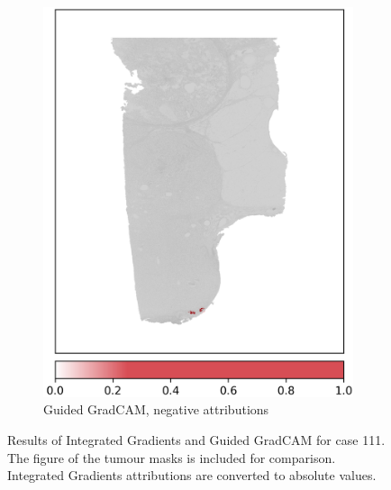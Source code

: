 \begin{figure}[h!t]
\begin{subfigure}[b]{0.49\textwidth}
         \includegraphics[width=\textwidth]{latex/captum/case111/guided_gradcam_neg_case111-stain1-censored_3499days.png}
         \caption{Guided GradCAM, negative attributions}
     \end{subfigure}
    \hfill
    \caption[Integrated gradients and Guided GradCAM for case 111]{Results of Integrated Gradients and Guided GradCAM for case 111. The figure of the tumour masks is included for comparison. Integrated Gradients attributions are converted to absolute values.}
    \label{fig:case111a}
\end{figure}



